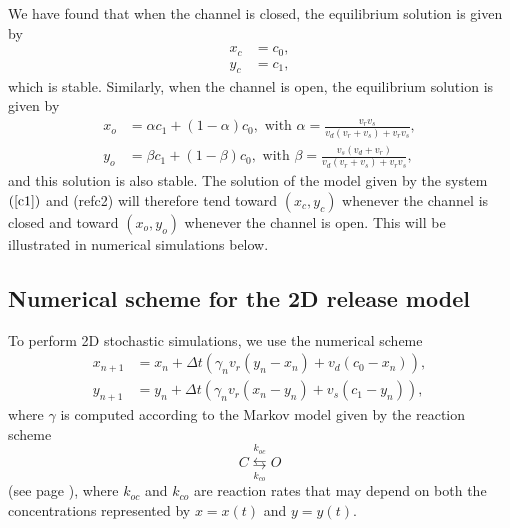 We have found that when the channel is closed, the equilibrium solution is given
by
\begin{align*}
x_{c} &  =c_{0},\\
y_{c} &  =c_{1},
\end{align*}
which is stable. Similarly, when the channel is open, the equilibrium solution 
is given by
\begin{align*}
x_{o} &  =\alpha c_{1}+\left(  1-\alpha\right)  c_{0},\text{ with }
\alpha=\frac{v_{r}v_{s}}{v_{d}\left(  v_{r}+v_{s}\right)  +v_{r}v_{s}},\\
y_{o} &  =\beta c_{1}+\left(  1-\beta\right)  c_{0},\text{ with }\beta
=\frac{v_{s}\left(  v_{d}+v_{r}\right)  }{v_{d}\left(  v_{r}+v_{s}\right)
+v_{r}v_{s}},
\end{align*}
and this solution is also stable. The solution of the model given by the system $\left(
\ref{c1}\right)$ and (ref{c2}) will therefore tend toward $(x_{c},y_{c})$
whenever the channel is closed and toward  $(x_{o},y_{o})$ whenever the
channel is open. This will be illustrated in numerical simulations below.


\subsection{Numerical scheme for the 2D release model}

To perform 2D stochastic simulations, we use the numerical scheme
\begin{align}
x_{n+1}  &  =x_{n}+\Delta t\left(  \gamma_{n}v_{r}\left(  y_{n}-x_{n}\right)
+v_{d}\left(  c_{0}-x_{n}\right)  \right)  ,\label{nc1}\\
y_{n+1}  &  =y_{n}+\Delta t\left(  \gamma_{n}v_{r}\left(  x_{n}-y_{n}\right)
+v_{s}\left(  c_{1}-y_{n}\right)  \right)  , \label{nc2}
\end{align}
where $\gamma$ is computed according to the Markov model given by the reaction scheme
\begin{equation}
C\underset{k_{co}}{\overset{k_{oc}}{\leftrightarrows}}O \label{Markov2}
\end{equation}
(see page \pageref{numscheme}),
where $k_{oc}$ and $k_{co}$ are reaction rates that may depend on both the concentrations
represented by $x=x(t)$ and $y=y(t)$.

